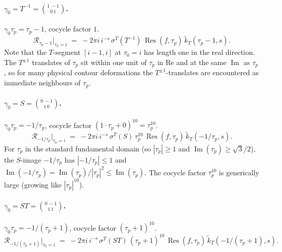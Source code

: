 \documentclass[11pt]{article}
\DeclareMathOperator{\Res}{Res}
\DeclareMathOperator{\im}{Im}
\newcommand{\re}{\mathrm{Re}}
\begin{document}
\paragraph{$\gamma_0 = T^{-1} = \binom{1\,-1}{0\,1}$.}
$\gamma_0\tau_p = \tau_p - 1$, cocycle factor $1$.
\begin{equation}\label{eq:res-Tinv}
  \mathcal{R}_{\tau_p - 1}\bigl|_{\tau_0=i}
  \;=\; -2\pi i\,i^{-s}\,\sigma^T(T^{-1})\,\Res(f, \tau_p)\,
  \widetilde{k}_T(\tau_p - 1, s).
\end{equation}
Note that the $T$-segment $[i - 1, i]$ at $\tau_0 = i$ has length one
in the real direction.  The $T^{\pm 1}$ translates of $\tau_p$ sit
within one unit of $\tau_p$ in $\re$ and at the same $\im$ as $\tau_p$,
so for many physical contour deformations the $T^{\pm 1}$-translates
are encountered as immediate neighbours of $\tau_p$.

\paragraph{$\gamma_0 = S = \binom{0\,-1}{1\,0}$.}
$\gamma_0\tau_p = -1/\tau_p$, cocycle factor $(1\cdot\tau_p + 0)^{10}
= \tau_p^{10}$.
\begin{equation}\label{eq:res-S}
  \mathcal{R}_{-1/\tau_p}\bigl|_{\tau_0=i}
  \;=\; -2\pi i\,i^{-s}\,\sigma^T(S)\,\tau_p^{10}\,
  \Res(f, \tau_p)\,\widetilde{k}_T(-1/\tau_p, s).
\end{equation}
For $\tau_p$ in the standard fundamental domain (so $|\tau_p| \ge 1$
and $\im(\tau_p) \ge \sqrt{3}/2$), the $S$-image $-1/\tau_p$ has
$|-1/\tau_p| \le 1$ and $\im(-1/\tau_p) = \im(\tau_p)/|\tau_p|^2 \le
\im(\tau_p)$.  The cocycle factor $\tau_p^{10}$ is generically large
(growing like $|\tau_p|^{10}$).

\paragraph{$\gamma_0 = ST = \binom{0\,-1}{1\,1}$.}
$\gamma_0\tau_p = -1/(\tau_p + 1)$, cocycle factor
$(\tau_p + 1)^{10}$.
\begin{equation}\label{eq:res-ST}
  \mathcal{R}_{-1/(\tau_p+1)}\bigl|_{\tau_0=i}
  \;=\; -2\pi i\,i^{-s}\,\sigma^T(ST)\,(\tau_p + 1)^{10}\,
  \Res(f, \tau_p)\,\widetilde{k}_T(-1/(\tau_p + 1), s).
\end{equation}
\end{document}
